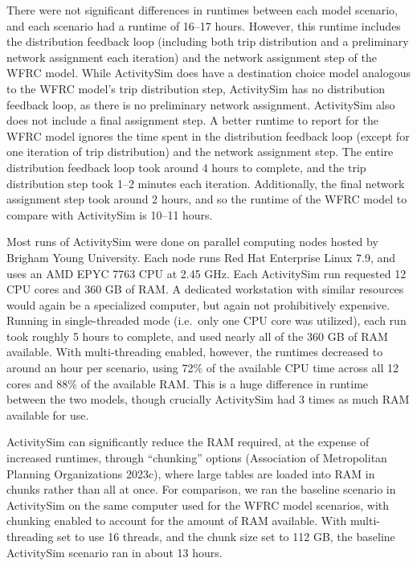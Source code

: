 \documentclass[fancy, oneside, mastersfancy, ms]{byuthesis}
\begin{document}
There were not significant differences in runtimes between each model
scenario, and each scenario had a runtime of 16--17 hours. However, this
runtime includes the distribution feedback loop (including both trip
distribution and a preliminary network assignment each iteration) and
the network assignment step of the WFRC model. While ActivitySim does
have a destination choice model analogous to the WFRC model's trip
distribution step, ActivitySim has no distribution feedback loop, as
there is no preliminary network assignment. ActivitySim also does not
include a final assignment step. A better runtime to report for the WFRC
model ignores the time spent in the distribution feedback loop (except
for one iteration of trip distribution) and the network assignment step.
The entire distribution feedback loop took around 4 hours to complete,
and the trip distribution step took 1--2 minutes each iteration.
Additionally, the final network assignment step took around 2 hours, and
so the runtime of the WFRC model to compare with ActivitySim is 10--11
hours.

Most runs of ActivitySim were done on parallel computing nodes hosted by
Brigham Young University. Each node runs Red Hat Enterprise Linux 7.9,
and uses an AMD EPYC 7763 CPU at 2.45 GHz. Each ActivitySim run
requested 12 CPU cores and 360 GB of RAM. A dedicated workstation with
similar resources would again be a specialized computer, but again not
prohibitively expensive. Running in single-threaded mode (i.e.~only one
CPU core was utilized), each run took roughly 5 hours to complete, and
used nearly all of the 360 GB of RAM available. With multi-threading
enabled, however, the runtimes decreased to around an hour per scenario,
using 72\% of the available CPU time across all 12 cores and 88\% of the
available RAM. This is a huge difference in runtime between the two
models, though crucially ActivitySim had 3 times as much RAM available
for use.

ActivitySim can significantly reduce the RAM required, at the expense of
increased runtimes, through ``chunking'' options (Association of
Metropolitan Planning Organizations 2023c), where large tables are
loaded into RAM in chunks rather than all at once. For comparison, we
ran the baseline scenario in ActivitySim on the same computer used for
the WFRC model scenarios, with chunking enabled to account for the
amount of RAM available. With multi-threading set to use 16 threads, and
the chunk size set to 112 GB, the baseline ActivitySim scenario ran in
about 13 hours.
\end{document}
